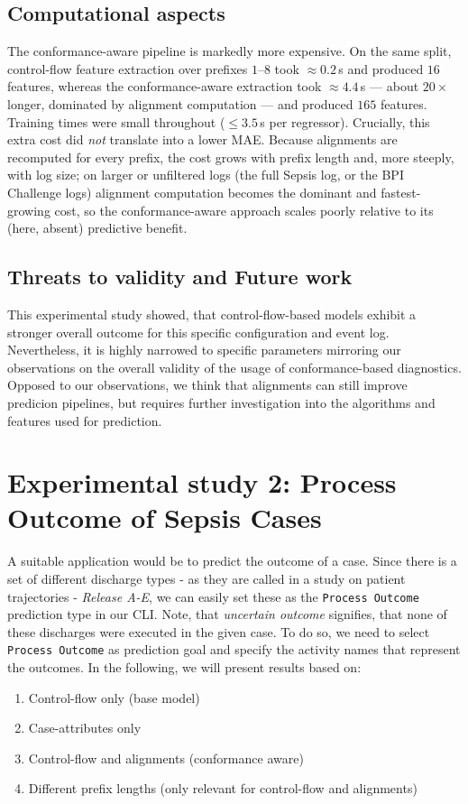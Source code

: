 \documentclass[12pt,a4paper]{article}
\begin{document}
\subsection{Computational aspects}
The conformance-aware pipeline is markedly more expensive. On the same split, control-flow feature extraction over prefixes $1$--$8$ took $\approx 0.2$\,s and produced $16$ features, whereas the conformance-aware extraction took $\approx 4.4$\,s --- about $20\times$ longer, dominated by alignment computation --- and produced $165$ features. Training times were small throughout ($\le 3.5$\,s per regressor). Crucially, this extra cost did \emph{not} translate into a lower MAE. Because alignments are recomputed for every prefix, the cost grows with prefix length and, more steeply, with log size; on larger or unfiltered logs (the full Sepsis log, or the BPI Challenge logs) alignment computation becomes the dominant and fastest-growing cost, so the conformance-aware approach scales poorly relative to its (here, absent) predictive benefit.

\subsection{Threats to validity and Future work}
This experimental study showed, that control-flow-based models exhibit a stronger overall outcome for this specific configuration and event log. Nevertheless, it is highly narrowed to specific parameters mirroring our observations on the overall validity of the usage of conformance-based diagnostics. Opposed to our observations, we think that alignments can still improve predicion pipelines, but requires further investigation into the algorithms and features used for prediction.

\section{Experimental study 2: Process Outcome of Sepsis Cases}
A suitable application would be to predict the outcome of a case. Since there is a set of different discharge types - as they are called in a study on patient trajectories \cite{sepsis_study} - \textit{Release A-E}, we can easily set these as the \texttt{Process Outcome} prediction type in our CLI. Note, that \textit{uncertain outcome} signifies, that none of these discharges were executed in the given case. To do so, we need to select \texttt{Process Outcome} as prediction goal and specify the activity names that represent the outcomes.
In the following, we will present results based on:
\begin{enumerate}
        \item Control-flow only (base model)
        \item Case-attributes only
        \item Control-flow and alignments (conformance aware)
        \item Different prefix lengths (only relevant for control-flow and alignments)
\end{enumerate}
\end{document}
